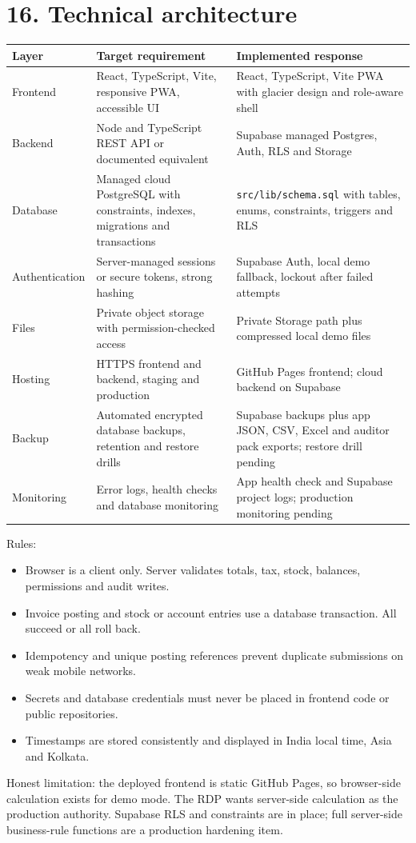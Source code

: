 \documentclass[11pt]{article}
\begin{document}
\section{16. Technical architecture}
\begin{center}\small\begin{tabularx}{\linewidth}{|*{3}{>{\raggedright\arraybackslash}X|}}
\hline
\textbf{Layer} & \textbf{Target requirement} & \textbf{Implemented response} \\
\hline
Frontend & React, TypeScript, Vite, responsive PWA, accessible UI & React, TypeScript, Vite PWA with glacier design and role-aware shell \\
\hline
Backend & Node and TypeScript REST API or documented equivalent & Supabase managed Postgres, Auth, RLS and Storage \\
\hline
Database & Managed cloud PostgreSQL with constraints, indexes, migrations and transactions & \texttt{src/lib/schema.sql} with tables, enums, constraints, triggers and RLS \\
\hline
Authentication & Server-managed sessions or secure tokens, strong hashing & Supabase Auth, local demo fallback, lockout after failed attempts \\
\hline
Files & Private object storage with permission-checked access & Private Storage path plus compressed local demo files \\
\hline
Hosting & HTTPS frontend and backend, staging and production & GitHub Pages frontend; cloud backend on Supabase \\
\hline
Backup & Automated encrypted database backups, retention and restore drills & Supabase backups plus app JSON, CSV, Excel and auditor pack exports; restore drill pending \\
\hline
Monitoring & Error logs, health checks and database monitoring & App health check and Supabase project logs; production monitoring pending \\
\hline
\end{tabularx}\end{center}
Rules:
\begin{itemize}[leftmargin=*,itemsep=2pt,topsep=2pt]
\item Browser is a client only. Server validates totals, tax, stock, balances, permissions and audit writes.
\item Invoice posting and stock or account entries use a database transaction. All succeed or all roll back.
\item Idempotency and unique posting references prevent duplicate submissions on weak mobile networks.
\item Secrets and database credentials must never be placed in frontend code or public repositories.
\item Timestamps are stored consistently and displayed in India local time, Asia and Kolkata.
\end{itemize}
Honest limitation: the deployed frontend is static GitHub Pages, so browser-side calculation exists for demo mode. The RDP wants server-side calculation as the production authority. Supabase RLS and constraints are in place; full server-side business-rule functions are a production hardening item.
\clearpage
\end{document}
